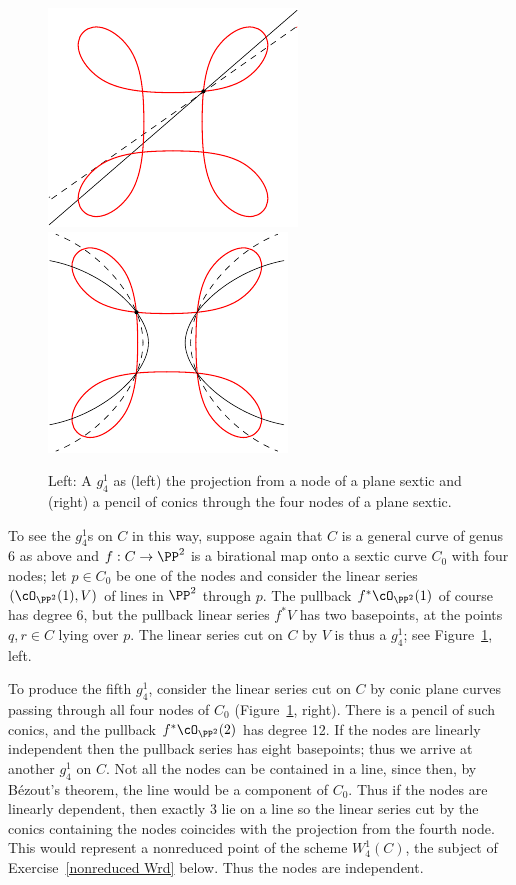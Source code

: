 \begin{figure}[b]
\hskip0pt
\hbox{\includegraphics[width=0.36\hsize]{main/Fig11-2-new}\quad}
\includegraphics[width=0.34\hsize]{main/Fig11-3-new}
\caption{Left: A $g^1_4$ as (left)
the projection from a node of a plane sextic
and (right)
a pencil of conics through the four nodes of a
plane sextic.
}
\label{plane sextic 1}
\end{figure}

To see the $g^{1}_{4}$s on $C$ in this way,  suppose again that $C$ is a
general curve of genus 6 as above and $f : C \to \PP^2$ is a birational
map onto a sextic curve $C_0$ with four nodes; let $p \in C_0$ be one of
the nodes and consider the linear series $(\cO_{\PP^2}(1),V)$ of lines
in $\PP^2$ through $p$. The pullback $f^*\cO_{\PP^2}(1)$ of course has
degree 6, but the pullback linear series $f^*V$ has two basepoints,
at the points $q, r \in C$ lying over $p$. The linear series cut on $C$
by $V$ is thus a $g^1_4$; see Figure~\ref{plane sextic 1}, left.

To produce the fifth $g^1_4$, consider the linear series cut on
$C$ by conic plane curves passing through all four nodes of $C_0$
(Figure~\ref{plane sextic 1}, right).  There is a pencil of such conics, and
the pullback $f^*\cO_{\PP^2}(2)$ has degree 12.
If the nodes are linearly independent then the pullback series has eight
basepoints; thus we arrive at another $g^1_4$ on $C$.  Not all the nodes
can be contained in a line, since then, by B\'ezout's theorem, the line
%
would be a component of $C_0$. Thus if the nodes are linearly dependent,
then exactly 3 lie on a line
so the linear series cut by the conics containing the nodes coincides
with the projection from the
fourth
node.
This would represent a nonreduced point of the scheme $W^1_4(C)$,
the subject of Exercise~\ref{nonreduced Wrd} below. Thus the nodes
are independent.

